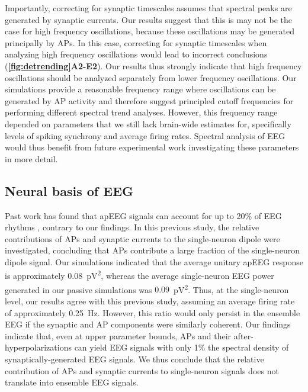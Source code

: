 Importantly, correcting for synaptic timescales assumes that spectral peaks are generated by synaptic currents. Our results suggest that this is may not be the case for high frequency oscillations, because these oscillations may be generated principally by APs. In this case, correcting for synaptic timescales when analyzing high frequency oscillations would lead to incorrect conclusions (\textbf{\autoref{fig:detrending}A2-E2}). Our results thus strongly indicate that high frequency oscillations should be analyzed separately from lower frequency oscillations. Our simulations provide a reasonable frequency range where oscillations can be generated by AP activity and therefore suggest principled cutoff frequencies for performing different spectral trend analyses. However, this frequency range depended on parameters that we still lack brain-wide estimates for, specifically levels of spiking synchrony and average firing rates. Spectral analysis of EEG would thus benefit from future experimental work investigating these parameters in more detail.
 
\subsection{Neural basis of EEG}
Past work has found that apEEG signals can account for up to 20\% of EEG rhythms \cite{Thio2023}, contrary to our findings. In this previous study, the relative contributions of APs and synaptic currents to the single-neuron dipole were investigated, concluding that APs contribute a large fraction of the single-neuron dipole signal. Our simulations indicated that the average unitary apEEG response is approximately $0.08$~\unit{\pico\volt^2}, whereas the average single-neuron EEG power generated in our passive simulations was $0.09$~\unit{\pico\volt^2}. Thus, at the single-neuron level, our results agree with this previous study, assuming an average firing rate of approximately \qty{0.25}{\hertz}. However, this ratio would only persist in the ensemble EEG if the synaptic and AP components were similarly coherent. Our findings indicate that, even at upper parameter bounds, APs and their after-hyperpolarizations can yield EEG signals with only 1\% the spectral density of synaptically-generated EEG signals. We thus conclude that the relative contribution of APs and synaptic currents to single-neuron signals does not translate into ensemble EEG signals.

